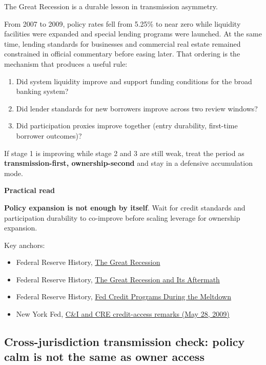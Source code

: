 \documentclass[11pt,openany]{book}
\begin{document}
The Great Recession is a durable lesson in transmission asymmetry.

From 2007 to 2009, policy rates fell from 5.25\% to near zero while liquidity facilities were expanded and special lending programs were launched. At the same time, lending standards for businesses and commercial real estate remained constrained in official commentary before easing later. That ordering is the mechanism that produces a useful rule:

\begin{enumerate}
  \item Did system liquidity improve and support funding conditions for the broad banking system?
  \item Did lender standards for new borrowers improve across two review windows?
  \item Did participation proxies improve together (entry durability, first-time borrower outcomes)?
\end{enumerate}

If stage 1 is improving while stage 2 and 3 are still weak, treat the period as \textbf{transmission-first, ownership-second} and stay in a defensive accumulation mode.

\begin{signalbox}
\textbf{Practical read}\par
\textbf{Policy expansion is not enough by itself}. Wait for credit standards and participation durability to co-improve before scaling leverage for ownership expansion.
\end{signalbox}

\noindent Key anchors:
\begin{itemize}
  \item Federal Reserve History, \href{https://www.federalreservehistory.org/essays/great-recession-of-200709}{The Great Recession}
  \item Federal Reserve History, \href{https://www.federalreservehistory.org/time-period/great-recession-and-its-aftermath}{The Great Recession and Its Aftermath}
  \item Federal Reserve History, \href{https://www.federalreservehistory.org/essays/fed-credit-programs}{Fed Credit Programs During the Meltdown}
  \item New York Fed, \href{https://www.newyorkfed.org/newsevents/speeches/2009/sch090528}{C\&I and CRE credit-access remarks (May 28, 2009)}
\end{itemize}

\subsection{Cross-jurisdiction transmission check: policy calm is not the same as owner access}
\label{subsec:cross-jurisdiction-policy-access}
\end{document}
